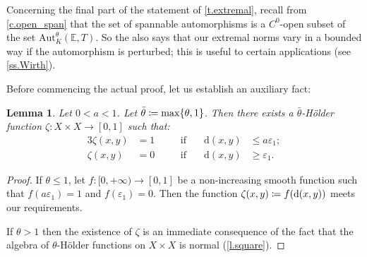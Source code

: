 \documentclass[10pt]{amsart}
\def\vcentcolon{\mathrel{\mathop\ordinarycolon}}
\providecommand\ordinarycolon{:}
\providecommand*\coloneqq{\vcentcolon\mathrel{\mkern-1.2mu}=}
\theoremstyle{plain}
\newtheorem{lemma}[theorem]{Lemma}
\theoremstyle{definition}
\newcommand{\EE}{\mathbb{E}}
\newcommand{\dd}{\mathrm{d}}
\newcommand{\Aut}{\mathrm{Aut}}
\let\epsilon\varepsilon
\begin{document}
Concerning the final part of the statement of \cref{t.extremal}, recall from \cref{c.open_span} that the set of spannable automorphisms is a $C^0$-open subset of the set $\Aut^\theta_K(\EE,T)$.
So the  also says that our extremal norms vary in a bounded way if the automorphism is perturbed; this is useful to certain applications (see \cref{ss.Wirth}).

Before commencing the actual proof, let us establish an auxiliary fact:

\begin{lemma}\label{l.bump}
Let $0<a<1$.
Let $\bar\theta \coloneqq \max\{\theta,1\}$.
Then there exists a $\bar{\theta}$-Hölder function $\zeta \colon X \times X \to [0,1]$ such that:
\begin{alignat*}{3}
\zeta(x,y) &= 1 &\quad &\text{if} &\quad \dd(x,y) &\le a\epsilon_1 ; \\
\zeta(x,y) &= 0 &\quad &\text{if} &\quad \dd(x,y) &\ge \epsilon_1.
\end{alignat*}
\end{lemma}

\begin{proof}
If $\theta \le 1$, let $f \colon [0,+\infty) \to [0,1]$ be a non-increasing smooth function such that $f(a\epsilon_1)=1$ and $f(\epsilon_1)=0$. Then the function $\zeta(x,y) \coloneqq f(\dd(x,y))$ meets our requirements.

If $\theta > 1$ then the existence of $\zeta$ is an immediate consequence of the fact that the algebra of $\theta$-Hölder functions on $X \times X$ is normal (\cref{l.square}).
\end{proof}
\end{document}
